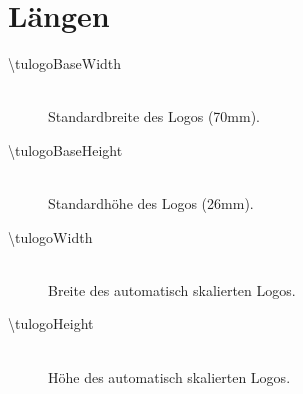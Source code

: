 \documentclass{scrartcl}
\begin{document}
\section{Längen}
  \begin{description}
    \item[\mdseries\ttfamily \textbackslash tulogoBaseWidth]\hfill\\
      Standardbreite des Logos (70mm).
    \item[\mdseries\ttfamily \textbackslash tulogoBaseHeight]\hfill\\
      Standardhöhe des Logos (26mm).
    \item[\mdseries\ttfamily \textbackslash tulogoWidth]\hfill\\
      Breite des automatisch skalierten Logos.
    \item[\mdseries\ttfamily \textbackslash tulogoHeight]\hfill\\
      Höhe des automatisch skalierten Logos.
  \end{description}
\end{document}
